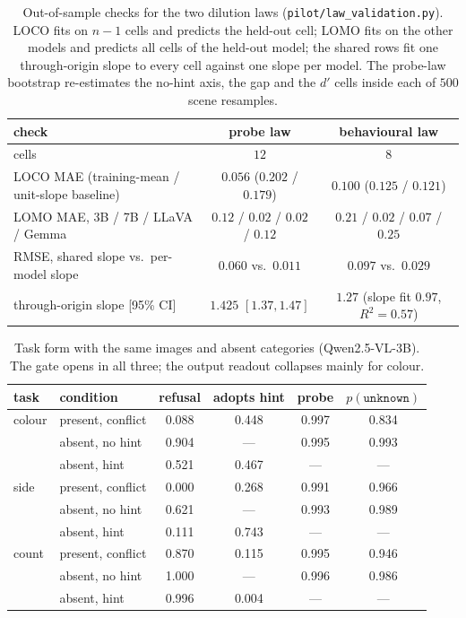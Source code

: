 \documentclass[10pt]{article}
\newcommand{\unknown}{\texttt{unknown}}
\newcommand{\punk}{p(\unknown)}
\begin{document}
\begin{table}[h]
\centering
\small
\caption{Out-of-sample checks for the two dilution laws (\texttt{pilot/law\_validation.py}). LOCO fits on $n-1$ cells and predicts the held-out cell; LOMO fits on the other models and predicts all cells of the held-out model; the shared rows fit one through-origin slope to every cell against one slope per model. The probe-law bootstrap re-estimates the no-hint axis, the gap and the $d'$ cells inside each of $500$ scene resamples.}
\label{tab:lawval}
\begin{tabular}{lcc}
\toprule
check & probe law & behavioural law \\
\midrule
cells & $12$ & $8$ \\
LOCO MAE (training-mean / unit-slope baseline) & $0.056$ ($0.202$ / $0.179$) & $0.100$ ($0.125$ / $0.121$) \\
LOMO MAE, 3B / 7B / LLaVA / Gemma & $0.12$ / $0.02$ / $0.02$ / $0.12$ & $0.21$ / $0.02$ / $0.07$ / $0.25$ \\
RMSE, shared slope vs.\ per-model slope & $0.060$ vs.\ $0.011$ & $0.097$ vs.\ $0.029$ \\
through-origin slope [95\% CI] & $1.425$ $[1.37,1.47]$ & $1.27$ (slope fit $0.97$, $R^2=0.57$) \\
\bottomrule
\end{tabular}
\end{table}

\begin{table}[h]
\centering
\small
\caption{Task form with the same images and absent categories (Qwen2.5-VL-3B). The gate opens in all three; the output readout collapses mainly for colour.}
\label{tab:task}
\begin{tabular}{llcccc}
\toprule
task & condition & refusal & adopts hint & probe & $\punk$ \\
\midrule
colour & present, conflict & 0.088 & 0.448 & 0.997 & 0.834 \\
 & absent, no hint & 0.904 & --- & 0.995 & 0.993 \\
 & absent, hint & 0.521 & 0.467 & --- & --- \\
side & present, conflict & 0.000 & 0.268 & 0.991 & 0.966 \\
 & absent, no hint & 0.621 & --- & 0.993 & 0.989 \\
 & absent, hint & 0.111 & 0.743 & --- & --- \\
count & present, conflict & 0.870 & 0.115 & 0.995 & 0.946 \\
 & absent, no hint & 1.000 & --- & 0.996 & 0.986 \\
 & absent, hint & 0.996 & 0.004 & --- & --- \\
\bottomrule
\end{tabular}
\end{table}
\end{document}
